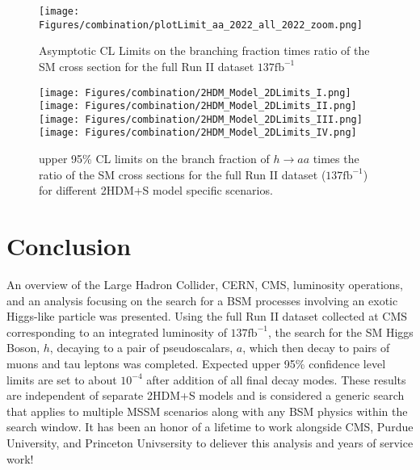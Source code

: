 \begin{figure}[ht!b]
\label{fig:CLsRunII} 
\centering
  \texttt{[image: Figures/combination/plotLimit\_aa\_2022\_all\_2022\_zoom.png]}
    \caption{Asymptotic CL Limits on the branching fraction times ratio of the SM cross section for the full Run II dataset $\text{137}\text{fb}^{-1}$}
\end{figure}

\begin{figure}[ht!b]
  \centering
  \texttt{[image: Figures/combination/2HDM\_Model\_2DLimits\_I.png]}
  \texttt{[image: Figures/combination/2HDM\_Model\_2DLimits\_II.png]}\\
  \texttt{[image: Figures/combination/2HDM\_Model\_2DLimits\_III.png]}
  \texttt{[image: Figures/combination/2HDM\_Model\_2DLimits\_IV.png]}\\
    \caption{\label{fig:2HDM}  upper 95\% CL limits on the branch fraction of $h\rightarrow a a $ times the ratio of the SM cross sections for the full Run II dataset ($\text{137}\text{fb}^{-1}$) for different 2HDM+S model specific scenarios.}
\end{figure}

\clearpage

\section{Conclusion}
\label{sec:conc}
An overview of the Large Hadron Collider, CERN, CMS, luminosity operations, and an analysis focusing on the search for a BSM processes involving an exotic Higgs-like particle was presented.
Using the full Run II dataset collected at CMS corresponding to an integrated luminosity of $\text{137}\text{fb}^{-1}$, the search for the SM Higgs Boson, $h$, decaying to a pair of pseudoscalars, $a$, which then decay to pairs of muons and tau leptons was completed. 
Expected upper 95\% confidence level limits are set to about $10^{-4}$ after addition of all final decay modes. 
These results are independent of separate 2HDM+S models and is considered a generic search that applies to multiple MSSM scenarios along with any BSM physics within the search window. 
It has been an honor of a lifetime to work alongside CMS, Purdue University, and Princeton Univsersity to deliever this analysis and years of service work! 
